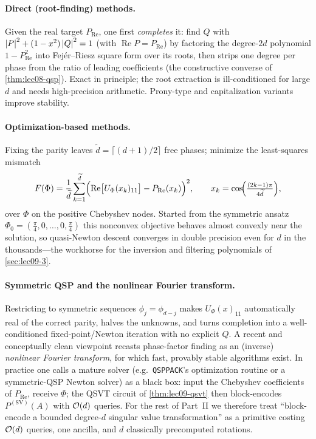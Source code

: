 \paragraph{Direct (root-finding) methods.} Given the real target $P_{\mathrm{Re}}$, one
first \emph{completes} it: find $Q$ with $\left\lvert P \right\rvert^2+(1-x^2)\left\lvert Q \right\rvert^2=1$ (with
$\operatorname{Re}P=P_{\mathrm{Re}}$) by factoring the degree-$2d$ polynomial
$1-P_{\mathrm{Re}}^2$ into Fej\'er--Riesz square form over its roots, then strips one
degree per phase from the ratio of leading coefficients (the constructive converse of
\cref{thm:lec08-qsp}). Exact in principle; the root extraction is ill-conditioned for
large $d$ and needs high-precision arithmetic. Prony-type and capitalization variants
improve stability.

\paragraph{Optimization-based methods.} Fixing the parity leaves
$\widetilde d=\lceil(d+1)/2\rceil$ free phases; minimize the least-squares mismatch
\begin{equation}
  F(\Phi)=\frac1{\widetilde d}\sum_{k=1}^{\widetilde d}
    \Bigl(\operatorname{Re}\bigl[U_\Phi(x_k)_{11}\bigr]-P_{\mathrm{Re}}(x_k)\Bigr)^2,
    \qquad x_k=\cos\!\Bigl(\tfrac{(2k-1)\pi}{4\widetilde d}\Bigr),
  \label{eq:lec09-optobj}
\end{equation}
over $\Phi$ on the positive Chebyshev nodes. Started from the symmetric ansatz
$\Phi_0=(\tfrac\pi4,0,\dots,0,\tfrac\pi4)$ this nonconvex objective behaves almost
convexly near the solution, so quasi-Newton descent converges in double precision even
for $d$ in the thousands---the workhorse for the inversion and filtering polynomials of
\cref{sec:lec09-3}.

\paragraph{Symmetric QSP and the nonlinear Fourier transform.} Restricting to symmetric
sequences $\phi_j=\phi_{d-j}$ makes $U_\Phi(x)_{11}$ automatically real of the correct
parity, halves the unknowns, and turns completion into a well-conditioned
fixed-point/Newton iteration with no explicit $Q$. A recent and conceptually clean
viewpoint recasts phase-factor finding as an (inverse) \emph{nonlinear Fourier
transform}, for which fast, provably stable algorithms exist. In practice one calls a
mature solver (e.g.\ \texttt{QSPPACK}'s optimization routine or a symmetric-QSP Newton
solver) as a black box: input the Chebyshev coefficients of $P_{\mathrm{Re}}$, receive
$\Phi$; the QSVT circuit of \cref{thm:lec09-qsvt} then block-encodes
$P^{(\mathrm{SV})}(A)$ with $\mathcal{O}(d)$ queries. For the rest of Part~II we therefore
treat ``block-encode a bounded degree-$d$ singular value transformation'' as a
primitive costing $\mathcal{O}(d)$ queries, one ancilla, and $d$ classically precomputed
rotations.

